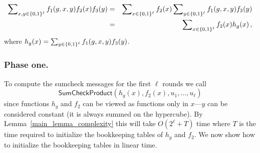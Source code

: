 \begin{eqnarray}
 \sum\nolimits_{x,y\in\{0,1\}^\ell}f_1(g,x,y)f_2(x)f_3(y)&=&\sum\nolimits_{x\in\{0,1\}^\ell}f_2(x)\sum\nolimits_{y\in\{0,1\}^\ell}f_1(g,x,y) f_3(y)\nonumber\\
&=& \sum\nolimits_{x\in\{0,1\}^\ell}f_2(x)   h_g(x)\nonumber\,,
\end{eqnarray}
where $h_g(x) = \sum_{y\in\{0,1\}^\ell}f_1(g,x,y) f_3(y)$. 


\subsubsection{Phase one.} 
To compute the sumcheck messages for the first $\ell$ rounds we  call $$\textsf{SumCheckProduct}(h_g(x),f_2(x),u_1,\ldots,u_\ell)$$ since functions $h_g$ and $f_2$ can be viewed as functions only in $x$---$y$ can be considered constant (it is always summed on the hypercube). By Lemma~\ref{main_lemma_complexity} this will take $O(2^\ell+T)$ time where $T$ is the time required to initialize the bookkeeping tables of $h_g$ and $f_2$. We now show how to initialize the bookkeeping tables in linear time.

